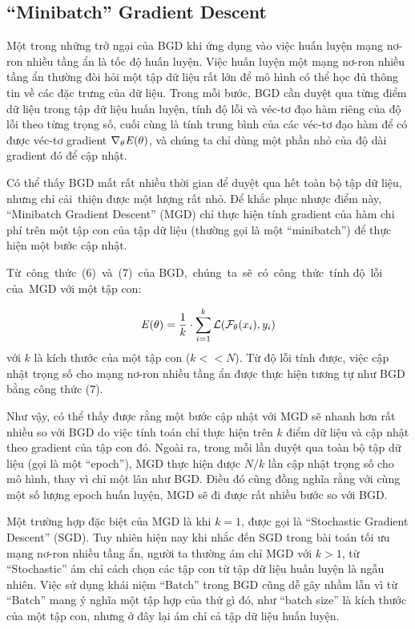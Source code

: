\subsection{``Minibatch'' Gradient Descent}

Một trong những trở ngại của BGD khi ứng dụng vào việc huấn luyện mạng nơ-ron nhiều tầng ẩn là tốc độ huấn luyện. Việc huấn luyện một mạng nơ-ron nhiều tầng ẩn thường đòi hỏi một tập dữ liệu rất lớn để mô hình có thể học đủ thông tin về các đặc trưng của dữ liệu. Trong mỗi bước, BGD cần duyệt qua từng điểm dữ liệu trong tập dữ liệu huấn luyện, tính độ lỗi và véc-tơ đạo hàm riêng của độ lỗi theo từng trọng số, cuối cùng là tính trung bình của các véc-tơ đạo hàm để có được véc-tơ gradient $\nabla_{\theta}\mathbf{\it{E}}(\theta)$, và chúng ta chỉ dùng một phần nhỏ của độ dài gradient đó để cập nhật.

Có thể thấy BGD mất rất nhiều thời gian để duyệt qua hết toàn bộ tập dữ liệu, nhưng chỉ cải thiện được một lượng rất nhỏ. Để khắc phục nhược điểm này, ``Minibatch Gradient Descent'' (MGD) chỉ thực hiện tính gradient của hàm chi phí trên một tập con của tập dữ liệu (thường gọi là một ``minibatch'') để thực hiện một bước cập nhật.

Từ công thức (6) và (7) của BGD, chúng ta sẽ có công thức tính độ lỗi của MGD với một tập con:

\begin{equation}
\label{eqn:E-minibatch}
\mathbf{\it{E}(\theta)} = \frac{1}{k}\cdot \sum_{i=1}^{k}\mathcal{L}(\mathcal{F}_\theta( x_i), y_i)
\end{equation}
với $k$ là kích thước của một tập con ($k<<N$). Từ độ lỗi tính được, việc cập nhật trọng số cho mạng nơ-ron nhiều tầng ẩn được thực hiện tương tự như BGD bằng công thức (7).

Như vậy, có thể thấy được rằng một bước cập nhật với MGD sẽ nhanh hơn rất nhiều so với BGD do việc tính toán chỉ thực hiện trên $k$ điểm dữ liệu và cập nhật theo gradient của tập con đó. Ngoài ra, trong mỗi lần duyệt qua toàn bộ tập dữ liệu (gọi là một ``epoch''), MGD thực hiện được $N/k$ lần cập nhật trọng số cho mô hình, thay vì chỉ một lân như BGD. Điều đó cũng đồng nghĩa rằng với cùng một số lượng epoch huấn luyện, MGD sẽ đi được rất nhiều bước so với BGD.

Một trường hợp đặc biệt của MGD là khi $k=1$, được gọi là ``Stochastic Gradient Descent'' (SGD). Tuy nhiên hiện nay khi nhắc đến SGD trong bài toán tối ưu mạng nơ-ron nhiều tầng ẩn, người ta thường ám chỉ MGD với $k>1$, từ ``Stochastic'' ám chỉ cách chọn các tập con từ tập dữ liệu huấn luyện là ngẫu nhiên. Việc sử dụng khái niệm ``Batch'' trong BGD cũng dễ gây nhầm lẫn vì từ ``Batch'' mang ý nghĩa một tập hợp của thứ gì đó, như ``batch size'' là kích thước của một tập con, nhưng ở đây lại ám chỉ cả tập dữ liệu huấn luyện\cite{goodfellow2016deeplearning}.

